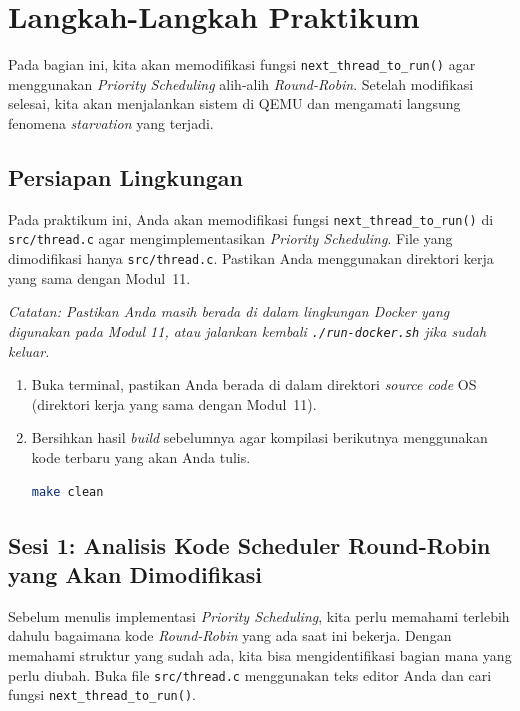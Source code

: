 \newpage
\section{Langkah-Langkah Praktikum}

Pada bagian ini, kita akan memodifikasi fungsi \texttt{next\_thread\_to\_run()} agar menggunakan \textit{Priority Scheduling} alih-alih \textit{Round-Robin}. Setelah modifikasi selesai, kita akan menjalankan sistem di QEMU dan mengamati langsung fenomena \textit{starvation} yang terjadi.

\subsection{Persiapan Lingkungan}
\label{sec:m12-persiapan}

Pada praktikum ini, Anda akan memodifikasi fungsi \texttt{next\_thread\_to\_run()} di \texttt{src/thread.c} agar mengimplementasikan \textit{Priority Scheduling}. File yang dimodifikasi hanya \texttt{src/thread.c}. Pastikan Anda menggunakan direktori kerja yang sama dengan Modul~11.

\textit{Catatan: Pastikan Anda masih berada di dalam lingkungan Docker yang digunakan pada Modul 11, atau jalankan kembali \texttt{./run-docker.sh} jika sudah keluar.}

\begin{enumerate}
	\item Buka terminal, pastikan Anda berada di dalam direktori \textit{source code} OS (direktori kerja yang sama dengan Modul~11).
	\item Bersihkan hasil \textit{build} sebelumnya agar kompilasi berikutnya menggunakan kode terbaru yang akan Anda tulis.
	      \begin{lstlisting}[language=bash, caption={Bersihkan build sebelumnya}]
make clean
    \end{lstlisting}
\end{enumerate}

\subsection{Sesi 1: Analisis Kode Scheduler Round-Robin yang Akan Dimodifikasi}
\label{sec:m12-sesi-1}

Sebelum menulis implementasi \textit{Priority Scheduling}, kita perlu memahami terlebih dahulu bagaimana kode \textit{Round-Robin} yang ada saat ini bekerja. Dengan memahami struktur yang sudah ada, kita bisa mengidentifikasi bagian mana yang perlu diubah. Buka file \texttt{src/thread.c} menggunakan teks editor Anda dan cari fungsi \texttt{next\_thread\_to\_run()}.

